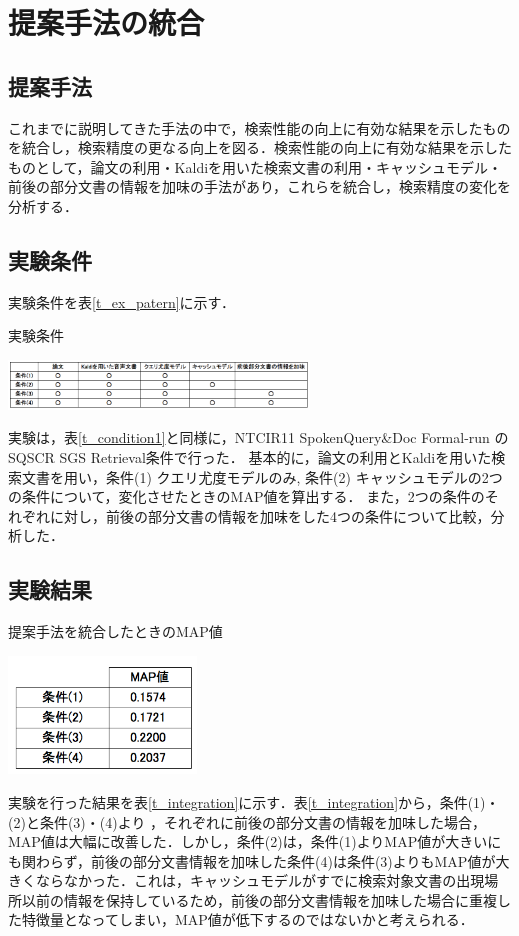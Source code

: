 \chapter{提案手法の統合}

\section{提案手法}

これまでに説明してきた手法の中で，検索性能の向上に有効な結果を示したものを統合し，検索精度の更なる向上を図る．検索性能の向上に有効な結果を示したものとして，論文の利用・Kaldiを用いた検索文書の利用・キャッシュモデル・前後の部分文書の情報を加味の手法があり，これらを統合し，検索精度の変化を分析する．

\section{実験条件}
実験条件を表\ref{t_ex_patern}に示す．

\begin{table}[h]
    \centering
    \caption{実験条件}
    \includegraphics[width=8cm]{./image/t_ex_patern2.png}
    \label{t_ex_patern}
\end{table}
実験は，表\ref{t_condition1}と同様に，NTCIR11 SpokenQuery\&Doc Formal-run の SQSCR SGS Retrieval条件で行った．
基本的に，論文の利用とKaldiを用いた検索文書を用い，条件(1) クエリ尤度モデルのみ, 条件(2) キャッシュモデルの2つの条件について，変化させたときのMAP値を算出する．
また，2つの条件のそれぞれに対し，前後の部分文書の情報を加味をした4つの条件について比較，分析した．

\section{実験結果}

\begin{table}[htbp]
    \centering
    \caption{提案手法を統合したときのMAP値}
    \includegraphics[width=5cm]{./image/t_integration4_1.png}
    \label{t_integration}
\end{table}

実験を行った結果を表\ref{t_integration}に示す．表\ref{t_integration}から，条件(1)・(2)と条件(3)・(4)より
，それぞれに前後の部分文書の情報を加味した場合，MAP値は大幅に改善した．しかし，条件(2)は，条件(1)よりMAP値が大きいにも関わらず，前後の部分文書情報を加味した条件(4)は条件(3)よりもMAP値が大きくならなかった．これは，キャッシュモデルがすでに検索対象文書の出現場所以前の情報を保持しているため，前後の部分文書情報を加味した場合に重複した特徴量となってしまい，MAP値が低下するのではないかと考えられる．


